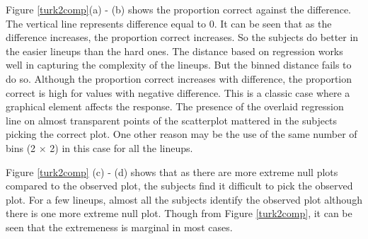 \documentclass[12]{article}
\begin{document}
Figure \ref{turk2comp}(a) - (b) shows the proportion correct against the difference. The vertical line represents difference equal to 0. It can be seen that as the difference increases, the proportion correct increases. So the subjects do better in the easier lineups than the hard ones. The distance based on regression works well in capturing the complexity of the lineups. But the binned distance fails to do so. Although the proportion correct increases with difference, the proportion correct is high for values with negative difference. This is a classic case where a graphical element affects the response. The presence of the overlaid regression line on almost transparent points of the scatterplot mattered in the subjects picking the correct plot. One other reason may be the use of the same number of bins (2 $\times$ 2) in this case for all the lineups. 

Figure \ref{turk2comp} (c) - (d) shows that as there are more extreme null plots compared to the observed plot, the subjects find it difficult to pick the observed plot. For a few lineups, almost all the subjects identify the observed plot although there is one more extreme null plot. Though from Figure \ref{turk2comp}, it can be seen that the extremeness is marginal in most cases. 
\end{document}

